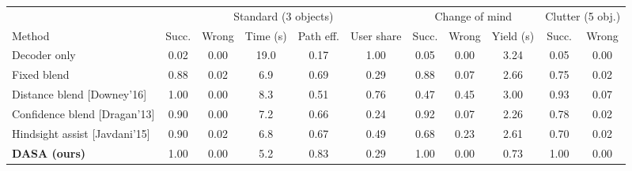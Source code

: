 \begin{tabular}{l ccccc ccc cc}
\toprule
& \multicolumn{5}{c}{Standard (3 objects)} & \multicolumn{3}{c}{Change of mind} & \multicolumn{2}{c}{Clutter (5 obj.)} \\
\cmidrule(lr){2-6}\cmidrule(lr){7-9}\cmidrule(lr){10-11}
Method & Succ. & Wrong & Time (s) & Path eff. & User share & Succ. & Wrong & Yield (s) & Succ. & Wrong \\
\midrule
Decoder only & 0.02 & 0.00 & 19.0 & 0.17 & 1.00 & 0.05 & 0.00 & 3.24 & 0.05 & 0.00 \\
Fixed blend & 0.88 & 0.02 & 6.9 & 0.69 & 0.29 & 0.88 & 0.07 & 2.66 & 0.75 & 0.02 \\
Distance blend [Downey'16] & 1.00 & 0.00 & 8.3 & 0.51 & 0.76 & 0.47 & 0.45 & 3.00 & 0.93 & 0.07 \\
Confidence blend [Dragan'13] & 0.90 & 0.00 & 7.2 & 0.66 & 0.24 & 0.92 & 0.07 & 2.26 & 0.78 & 0.02 \\
Hindsight assist [Javdani'15] & 0.90 & 0.02 & 6.8 & 0.67 & 0.49 & 0.68 & 0.23 & 2.61 & 0.70 & 0.02 \\
\textbf{DASA (ours)} & 1.00 & 0.00 & 5.2 & 0.83 & 0.29 & 1.00 & 0.00 & 0.73 & 1.00 & 0.00 \\
\bottomrule
\end{tabular}
